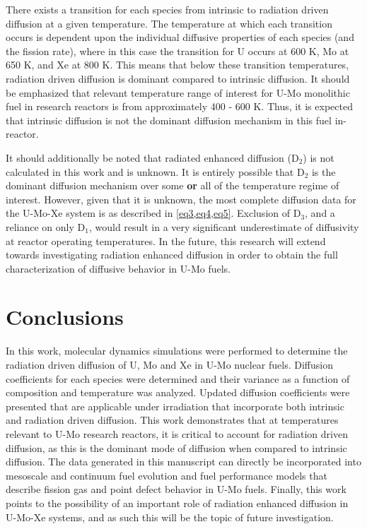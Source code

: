 \documentclass[review]{elsarticle}
\providecommand{\DIFaddtex}[1]{{\bf #1}} %
\providecommand{\DIFdeltex}[1]{} %
\providecommand{\DIFaddbegin}{\protect\color{blue}} %
\providecommand{\DIFaddend}{\protect\color{black}} %
\providecommand{\DIFdelbegin}{\protect\color{red}} %
\providecommand{\DIFdelend}{\protect\color{black}} %
\providecommand{\DIFadd}[1]{\texorpdfstring{\DIFaddtex{#1}}{#1}} %
\providecommand{\DIFdel}[1]{\texorpdfstring{\DIFdeltex{#1}}{}} %
\newcommand{\DIFscaledelfig}{0.5}
\newlength{\DIFdelgraphicswidth} %
\newlength{\DIFdelgraphicsheight} %
\newcommand{\DIFaddincludegraphics}[2][]{{\color{blue}\fbox{\DIFOincludegraphics[#1]{#2}}}} %
\newcommand{\DIFdelincludegraphics}[2][]{%
\sbox{\DIFdelgraphicsbox}{\DIFOincludegraphics[#1]{#2}}%
\settoboxwidth{\DIFdelgraphicswidth}{\DIFdelgraphicsbox} %
\settoboxtotalheight{\DIFdelgraphicsheight}{\DIFdelgraphicsbox} %
\scalebox{\DIFscaledelfig}{%
\parbox[b]{\DIFdelgraphicswidth}{\usebox{\DIFdelgraphicsbox}\\[-\baselineskip] \rule{\DIFdelgraphicswidth}{0em}}\llap{\resizebox{\DIFdelgraphicswidth}{\DIFdelgraphicsheight}{%
\setlength{\unitlength}{\DIFdelgraphicswidth}%
\begin{picture}(1,1)%
\thicklines\linethickness{2pt} %
{\color[rgb]{1,0,0}\put(0,0){\framebox(1,1){}}}%
{\color[rgb]{1,0,0}\put(0,0){\line( 1,1){1}}}%
{\color[rgb]{1,0,0}\put(0,1){\line(1,-1){1}}}%
\end{picture}%
}\hspace*{3pt}}} %
} %
\DeclareRobustCommand{\DIFaddbegin}{\DIFOaddbegin \let\includegraphics\DIFaddincludegraphics} %
\DeclareRobustCommand{\DIFaddend}{\DIFOaddend \let\includegraphics\DIFOincludegraphics} %
\DeclareRobustCommand{\DIFdelbegin}{\DIFOdelbegin \let\includegraphics\DIFdelincludegraphics} %
\DeclareRobustCommand{\DIFdelend}{\DIFOaddend \let\includegraphics\DIFOincludegraphics} %
\begin{document}
There exists a transition for each species from intrinsic to radiation driven diffusion at a given temperature. The temperature at which each transition occurs is dependent upon the individual diffusive properties of each species (and the fission rate), where in this case the transition for U occurs at 600 K, Mo at 650 K, and Xe at 800 K. This means that below these transition temperatures, radiation driven diffusion is dominant compared to intrinsic diffusion. It should be emphasized that relevant temperature range of interest for U-Mo monolithic fuel in research reactors is from approximately 400 - 600 K. Thus, it is expected that intrinsic diffusion is not the dominant diffusion mechanism in this fuel in-reactor.

It should additionally be noted that radiated enhanced diffusion (D$_2$) is not calculated in this work and is unknown. It is entirely possible that D$_2$ is the dominant diffusion mechanism over some \DIFdelbegin \DIFdel{of }\DIFdelend \DIFaddbegin \DIFadd{or }\DIFaddend all of the temperature regime of interest. However, given that it is unknown, the most complete diffusion data for the U-Mo-Xe system is as described in \cref{eq3,eq4,eq5}. Exclusion of D$_3$, and a reliance on only D$_1$, would result in a very significant underestimate of diffusivity at reactor operating temperatures. In the future, this research will extend towards investigating radiation enhanced diffusion in order to obtain the full characterization of diffusive behavior in U-Mo fuels. 

\FloatBarrier

\section{Conclusions}

In this work, molecular dynamics simulations were performed to determine the radiation driven diffusion of U, Mo and Xe in U-Mo nuclear fuels. Diffusion coefficients for each species were determined and their variance as a function of composition and temperature was analyzed. Updated diffusion coefficients were presented that are applicable under irradiation that incorporate both intrinsic and radiation driven diffusion. This work demonstrates that at temperatures relevant to U-Mo research reactors, it is critical to account for radiation driven diffusion, as this is the dominant mode of diffusion when compared to intrinsic diffusion. The data generated in this manuscript can directly be incorporated into mesoscale and continuum fuel evolution and fuel performance models that describe fission gas and point defect behavior in U-Mo fuels. Finally, this work points to the possibility of an important role of radiation enhanced diffusion in U-Mo-Xe systems, and as such this will be the topic of future investigation. 
\end{document}
